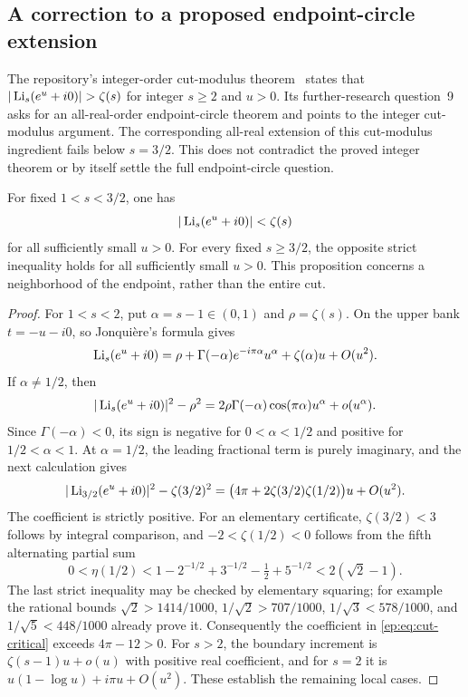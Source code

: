\subsection{A correction to a proposed endpoint-circle extension}

The repository's integer-order cut-modulus theorem~\cite{RepoInverse} states that
$|\Li_s(e^u+i0)|>\zeta(s)$ for integer $s\ge2$ and
$u>0$. Its further-research question~9 asks for an all-real-order
endpoint-circle theorem and points to the integer cut-modulus argument.
The corresponding all-real extension of this cut-modulus ingredient
fails below $s=3/2$. This does not contradict the proved integer
theorem or by itself settle the full endpoint-circle question.

\begin{proposition}
\label{ep:prop:cut-counterexample}
For fixed $1<s<3/2$, one has
\[
 |\operatorname{Li}_s(e^u+i0)|<\zeta(s)
\]
for all sufficiently small $u>0$. For every fixed $s\ge3/2$, the
opposite strict inequality holds for all sufficiently small $u>0$.
This proposition concerns a neighborhood of the endpoint, rather
than the entire cut.
\end{proposition}

\begin{proof}
For $1<s<2$, put $\alpha=s-1\in(0,1)$ and $\rho=\zeta(s)$.
On the upper bank $t=-u-i0$, so Jonqui\`ere's formula gives
\[
 \operatorname{Li}_s(e^u+i0)
 =\rho+\Gamma(-\alpha)e^{-i\pi\alpha}u^\alpha
       +\zeta(\alpha)u+O(u^2).
\]
If $\alpha\ne1/2$, then
\[
 |\operatorname{Li}_s(e^u+i0)|^2-\rho^2
 =2\rho\Gamma(-\alpha)\cos(\pi\alpha)u^\alpha
      +o(u^\alpha).
\]
Since $\Gamma(-\alpha)<0$, its sign is negative for
$0<\alpha<1/2$ and positive for $1/2<\alpha<1$.
At $\alpha=1/2$, the leading fractional term is purely imaginary,
and the next calculation gives
\begin{equation}
 |\operatorname{Li}_{3/2}(e^u+i0)|^2-\zeta(3/2)^2
 =\bigl(4\pi+2\zeta(3/2)\zeta(1/2)\bigr)u+O(u^2).
 \label{ep:eq:cut-critical}
\end{equation}
The coefficient is strictly positive. For an elementary certificate,
$\zeta(3/2)<3$ follows by integral comparison, and
$-2<\zeta(1/2)<0$ follows from the fifth alternating partial sum
\[
 0<\eta(1/2)<1-2^{-1/2}+3^{-1/2}-\tfrac12+5^{-1/2}
                   <2(\sqrt2-1).
\]
The last strict inequality may be checked by elementary squaring;
for example the rational bounds
$\sqrt2>1414/1000$, $1/\sqrt2>707/1000$,
$1/\sqrt3<578/1000$, and $1/\sqrt5<448/1000$
already prove it. Consequently the coefficient in
\eqref{ep:eq:cut-critical} exceeds $4\pi-12>0$.
For $s>2$, the boundary increment is
$\zeta(s-1)u+o(u)$ with positive real coefficient, and for $s=2$
it is $u(1-\log u)+i\pi u+O(u^2)$.
These establish the remaining local cases.
\end{proof}

